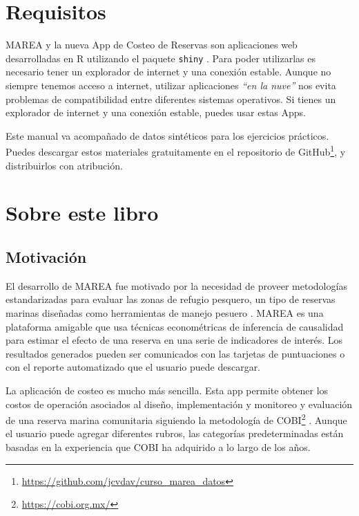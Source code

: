\documentclass[]{krantz}
\renewcommand{\href}[2]{#2\footnote{\url{#1}}}
\begin{document}
\hypertarget{requisitos}{%
\section{Requisitos}\label{requisitos}}

MAREA y la nueva App de Costeo de Reservas son aplicaciones web
desarrolladas en R utilizando el paquete \texttt{shiny}
\citep{R-base, R-shiny}. Para poder utilizarlas es necesario tener un
explorador de internet y una conexión estable. Aunque no siempre tenemos
acceso a internet, utilizar aplicaciones \emph{``en la nuve''} nos evita
problemas de compatibilidad entre diferentes sistemas operativos. Si
tienes un explorador de internet y una conexión estable, puedes usar
estas Apps.

Este manual va acompañado de datos sintéticos para los ejercicios
prácticos. Puedes descargar estos materiales gratuitamente en el
\href{https://github.com/jcvdav/curso_marea_datos}{repositorio de
GitHub}, y distribuirlos con atribución.

\hypertarget{sobre-este-libro}{%
\section{Sobre este libro}\label{sobre-este-libro}}

\hypertarget{motivacion}{%
\subsection{Motivación}\label{motivacion}}

El desarrollo de MAREA fue motivado por la necesidad de proveer
metodologías estandarizadas para evaluar las zonas de refugio pesquero,
un tipo de reservas marinas diseñadas como herramientas de manejo
pesuero \citep{nom}. MAREA es una plataforma amigable que usa técnicas
econométricas de inferencia de causalidad para estimar el efecto de una
reserva en una serie de indicadores de interés. Los resultados generados
pueden ser comunicados con las tarjetas de puntuaciones o con el reporte
automatizado que el usuario puede descargar.

La aplicación de costeo es mucho más sencilla. Esta app permite obtener
los costos de operación asociados al diseño, implementación y monitoreo
y evaluación de una reserva marina comunitaria siguiendo la metodología
de \href{https://cobi.org.mx/}{COBI} \citep{uribe_2010}. Aunque el
usuario puede agregar diferentes rubros, las categorías predeterminadas
están basadas en la experiencia que COBI ha adquirido a lo largo de los
años.
\end{document}
